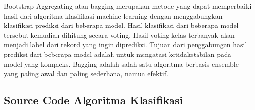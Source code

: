 Bootstrap Aggregating atau bagging merupakan metode yang dapat memperbaiki hasil dari algoritma klasifikasi machine learning dengan menggabungkan klasifikasi prediksi dari beberapa model. Hasil klasifikasi dari beberapa model tersebut kemudian dihitung secara voting. Hasil voting kelas terbanyak akan menjadi label dari rekord yang ingin diprediksi. Tujuan dari penggabungan hasil prediksi dari beberapa model adalah untuk mengatasi ketidakstabilan pada model yang kompleks. Bagging adalah salah satu algoritma berbasis ensemble yang paling awal dan paling sederhana, namun efektif. 
 

\subsection{Source Code Algoritma Klasifikasi}
 
